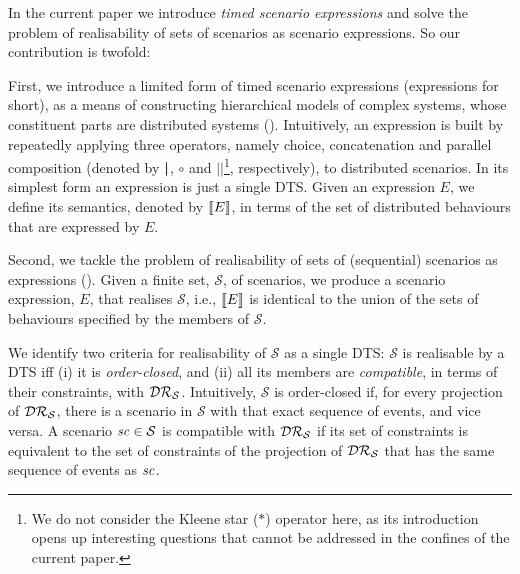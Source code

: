 In the current paper we introduce \emph{timed scenario expressions}
and solve the problem of realisability of sets of
scenarios as scenario expressions.
So our contribution is twofold:

First, we introduce a limited form of timed scenario expressions (expressions
for short), as a means
of constructing hierarchical models of complex systems, whose constituent
parts are distributed systems (). Intuitively, an expression is built by
repeatedly applying three operators, namely choice,
concatenation and parallel composition (denoted by $\boldsymbol{|}$, $\circ$ and
$||$\footnote{We do not consider the Kleene star ($*$) operator here, as its
introduction opens up interesting questions that cannot
be addressed in the confines of the current paper.}, respectively), to
distributed scenarios. In its simplest form an
expression is just a single DTS.
Given an expression $E$, we
define its semantics, denoted by $\llbracket E \rrbracket$, in terms of the set
of distributed behaviours that are expressed by $E$.

Second, we tackle the problem of realisability of sets of (sequential)
scenarios as expressions (). Given a finite
set, $\mathcal{S}$, of scenarios, we produce a scenario
expression, $E$, that realises $\mathcal{S}$,
i.e., $\llbracket E \rrbracket$ is identical to the union of the sets of behaviours
specified by the members of $\mathcal{S}$.

We identify two criteria for realisability of $\mathcal{S}$ as a
single DTS: $\mathcal{S}$ is realisable by a DTS iff (i) it
is \emph{order-closed}, and (ii) all its members are \emph{compatible}, in
terms of their constraints, with $\mathcal{DR}_{\mathcal{S}}$.
Intuitively,
$\mathcal{S}$ is order-closed if, for every projection of
$\mathcal{DR}_{\mathcal{S}}$, there is a scenario in $\mathcal{S}$
with that exact sequence of events, and vice versa.
A scenario $\mathit{sc}\in\mathcal{S}$ is compatible with
$\mathcal{DR}_{\mathcal{S}}$ if its set of constraints is equivalent to the set
of constraints of the projection of $\mathcal{DR}_{\mathcal{S}}$ that
has the same sequence of events as $\mathit{sc}$.

